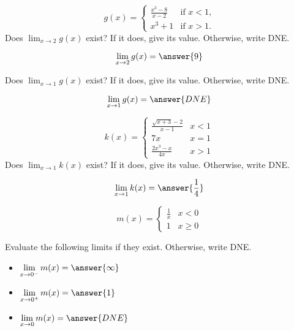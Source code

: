 \documentclass[handout]{ximera}
\begin{document}
\begin{exercise}
\[
g(x) = \begin{cases}
  \frac{x^3 - 8}{x-2}  &\text{if $x<1$,} \\
  x^3+1 &\text{if  $x>1$.}
\end{cases}
\]
Does $\lim_{x \to 2} g(x)$ exist?  If it does, give its value.
Otherwise, write DNE.

\[
\lim_{x \to 2} g(x) = \answer{9}
\]

Does $\lim_{x \to 1} g(x)$ exist?  If it does, give its value.
Otherwise, write DNE.

\[
\lim_{x \to 1} g(x) = \answer{DNE}
\]
\end{exercise}

\begin{exercise}
\[
k(x) = \begin{cases}
  \frac{\sqrt{x+3}-2}{x-1}  & x<1 \\
  7x & x=1 \\
  \frac{2x^3 -x}{4x} & x > 1
\end{cases}
\]
Does $\lim_{x \to 1} k(x)$ exist?  If it does, give its value.
Otherwise, write DNE.

\[
\lim_{x \to 1} k(x) = \answer{\frac{1}{4}}
\]
\end{exercise}

\begin{exercise}
\[
m(x) = \begin{cases}
  \frac{1}{x}  & x < 0 \\
  1 & x \geq 0
\end{cases}
\]

Evaluate the following limits if they exist.  Otherwise, write DNE. 

\begin{itemize}

\item $\displaystyle\lim_{x \to 0^-} m(x) = \answer{\infty}$

\item $\displaystyle\lim_{x \to 0^+} m(x) = \answer{1}$

\item $\displaystyle\lim_{x \to 0} m(x) = \answer{DNE}$

\end{itemize}

\end{exercise}
\end{document}

